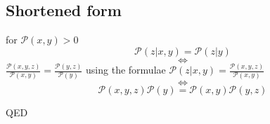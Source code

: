 \documentclass[10pt]{article}
\begin{document}
\subsection{Shortened form}
for $\mathcal{P}(x,y)>0$
\[\mathcal{P}(z|x,y)=\mathcal{P}(z|y)\]
\[\Leftrightarrow\]
$\frac{\mathcal{P}(x,y,z)}{\mathcal{P}(x,y)}=\frac{\mathcal{P}(y,z)}{\mathcal{P}(y)}$ using the formulae $\mathcal{P}(z|x,y) = \frac{\mathcal{P}(x,y,z)}{\mathcal{P}(x,y)}$
\[\Leftrightarrow\]
\[\mathcal{P}(x,y,z)\mathcal{P}(y)=\mathcal{P}(x,y)\mathcal{P}(y,z)
\]

QED
\end{document}
